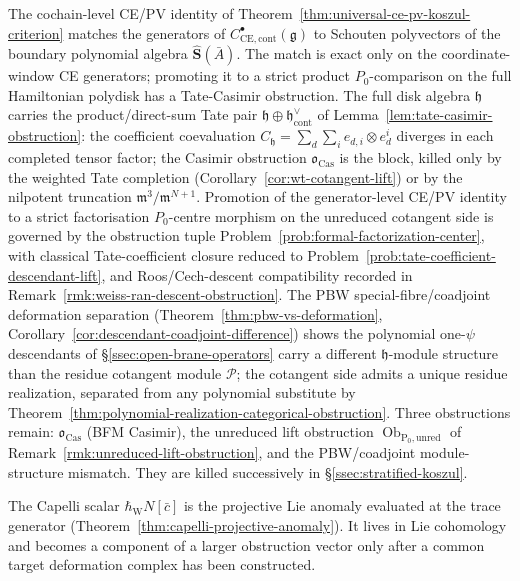 \documentclass[11pt]{memoir}
\begin{document}
\begin{rmk}\label{rmk:strict-product-p0-obstruction}
  The cochain-level CE/PV identity of
  Theorem~\ref{thm:universal-ce-pv-koszul-criterion} matches the
  generators of \(C^\bullet_{\mathrm{CE},\mathrm{cont}}(\mathfrak g)\)
  to Schouten polyvectors of the boundary polynomial algebra
  \(\widehat{\mathbf S}(\bar A)\).  The match is exact only on the
  coordinate-window CE generators; promoting it to a strict product
  \(P_0\)-comparison on the full Hamiltonian polydisk has a Tate-Casimir
  obstruction.  The full
  disk algebra \(\mathfrak h\) carries the product/direct-sum Tate pair
  \(\mathfrak h\oplus\mathfrak h^\vee_{\mathrm{cont}}\) of
  Lemma~\ref{lem:tate-casimir-obstruction}: the coefficient
  coevaluation
  \(C_{\mathfrak h}=\sum_d\sum_i e_{d,i}\otimes e^i_d\) diverges in
  each completed tensor factor; the Casimir
  obstruction \(\mathfrak o_{\mathrm{Cas}}\) is the block, killed
  only by the weighted Tate completion
  (Corollary~\ref{cor:wt-cotangent-lift}) or by the nilpotent
  truncation \(\mathfrak m^3/\mathfrak m^{N+1}\).  Promotion of the
  generator-level CE/PV identity to a strict factorisation
  \(P_0\)-centre morphism on the unreduced cotangent side is governed by
  the obstruction tuple
  Problem~\ref{prob:formal-factorization-center}, with classical
  Tate-coefficient closure reduced to
  Problem~\ref{prob:tate-coefficient-descendant-lift}, and Roos/Cech-descent
  compatibility recorded in
  Remark~\ref{rmk:weiss-ran-descent-obstruction}.  The PBW
  special-fibre/coadjoint deformation separation
  (Theorem~\ref{thm:pbw-vs-deformation},
  Corollary~\ref{cor:descendant-coadjoint-difference}) shows the
  polynomial one-\(\psi\) descendants of
  \S\ref{ssec:open-brane-operators} carry a different
  \(\mathfrak h\)-module structure than the residue cotangent module
  \(\mathcal P\); the cotangent side admits a unique residue
  realization, separated from any polynomial substitute by
  Theorem~\ref{thm:polynomial-realization-categorical-obstruction}.
  Three obstructions remain:
  \(\mathfrak o_{\mathrm{Cas}}\) (BFM Casimir), the unreduced lift
  obstruction \(\operatorname{Ob}_{\mathrm{P_0,unred}}\) of
  Remark~\ref{rmk:unreduced-lift-obstruction}, and the PBW/coadjoint
	  module-structure mismatch.  They are killed successively in
	  \S\ref{ssec:stratified-koszul}.
\end{rmk}

The Capelli scalar \(\hbar_{\mathrm{W}}N[\bar c]\) is the projective Lie anomaly
evaluated at the trace generator
(Theorem~\ref{thm:capelli-projective-anomaly}).  It lives in
Lie cohomology and becomes a component of a larger obstruction vector
only after a common target deformation complex has been constructed.
\end{document}
